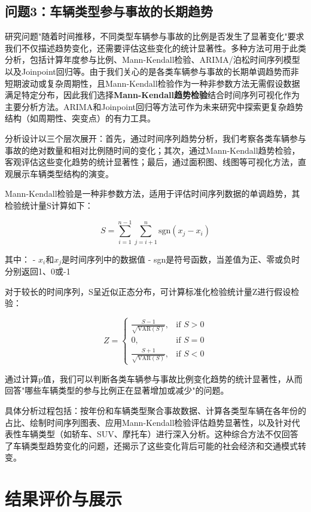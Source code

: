 \documentclass[12pt,a4paper]{article}
\begin{document}
\subsection{问题3：车辆类型参与事故的长期趋势}

研究问题"随着时间推移，不同类型车辆参与事故的比例是否发生了显著变化"要求我们不仅描述趋势变化，还需要评估这些变化的统计显著性。多种方法可用于此类分析，包括计算年度参与比例、Mann-Kendall检验、ARIMA/泊松时间序列模型以及Joinpoint回归等。由于我们关心的是各类车辆参与事故的长期单调趋势而非短期波动或复杂周期性，且Mann-Kendall检验作为一种非参数方法无需假设数据满足特定分布，因此我们选择\textbf{Mann-Kendall趋势检验}结合时间序列可视化作为主要分析方法。ARIMA和Joinpoint回归等方法可作为未来研究中探索更复杂趋势结构（如周期性、突变点）的有力工具。

分析设计以三个层次展开：首先，通过时间序列趋势分析，我们考察各类车辆参与事故的绝对数量和相对比例随时间的变化；其次，通过Mann-Kendall趋势检验，客观评估这些变化趋势的统计显著性；最后，通过面积图、线图等可视化方法，直观展示车辆类型结构的演变。

Mann-Kendall检验是一种非参数方法，适用于评估时间序列数据的单调趋势，其检验统计量S计算如下：

$$
S = \sum_{i=1}^{n-1} \sum_{j=i+1}^{n} \text{sgn}(x_j - x_i)
$$

其中：
- $x_i$和$x_j$是时间序列中的数据值
- sgn是符号函数，当差值为正、零或负时分别返回1、0或-1

对于较长的时间序列，S呈近似正态分布，可计算标准化检验统计量Z进行假设检验：

$$
Z = 
\begin{cases}
\frac{S-1}{\sqrt{\text{VAR}(S)}}, & \text{if } S > 0 \\
0, & \text{if } S = 0 \\
\frac{S+1}{\sqrt{\text{VAR}(S)}}, & \text{if } S < 0
\end{cases}
$$

通过计算p值，我们可以判断各类车辆参与事故比例变化趋势的统计显著性，从而回答"哪些车辆类型的参与比例正在显著增加或减少"的问题。

具体分析过程包括：按年份和车辆类型聚合事故数据、计算各类型车辆在各年份的占比、绘制时间序列图表、应用Mann-Kendall检验评估趋势显著性，以及针对代表性车辆类型（如轿车、SUV、摩托车）进行深入分析。这种综合方法不仅回答了车辆类型趋势变化的问题，还揭示了这些变化背后可能的社会经济和交通模式转变。


\section{结果评价与展示}
\end{document}
